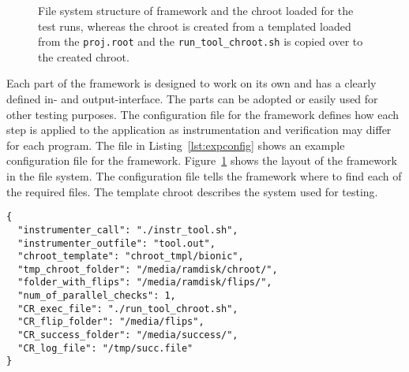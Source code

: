 \begin{figure}
\centering
{}
\caption{File system structure of framework and the chroot loaded for the test
runs, whereas the chroot is created from a templated loaded from the
\texttt{proj.root} and the \texttt{run\_tool\_chroot.sh} is copied over to the
created chroot.}
\label{fig:framfilesys}
\end{figure}

Each part of the framework is designed to work on its own and has a clearly
defined in- and output-interface. The parts can be adopted or easily used for
other testing purposes. The configuration file for the framework defines how
each step is applied to the application as instrumentation and verification may
differ for each program. The file in Listing~\ref{lst:expconfig} shows an
example configuration file for the framework. Figure~\ref{fig:framfilesys} shows
the layout of the framework in the file system. The configuration file tells the
framework where to find each of the required files. The template chroot
describes the system used for testing.

\begin{minipage}{\linewidth}
\begin{lstlisting}[style=nasm,
                   caption={JSON style config file for the framework, showing
all parameters used to tweak each part of the framework. Entries
starting with \texttt{CR\_} are used inside the testing \texttt{chroot}.},
                   label={lst:expconfig}]
{
  "instrumenter_call": "./instr_tool.sh",
  "instrumenter_outfile": "tool.out",
  "chroot_template": "chroot_tmpl/bionic",
  "tmp_chroot_folder": "/media/ramdisk/chroot/",
  "folder_with_flips": "/media/ramdisk/flips/",
  "num_of_parallel_checks": 1,
  "CR_exec_file": "./run_tool_chroot.sh",
  "CR_flip_folder": "/media/flips",
  "CR_success_folder": "/media/success/",
  "CR_log_file": "/tmp/succ.file"
}
\end{lstlisting}
\end{minipage}

